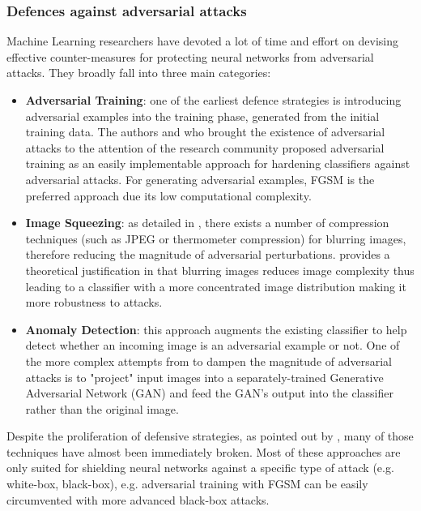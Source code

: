 \subsubsection{Defences against adversarial attacks}

Machine Learning researchers have devoted a lot of time and effort on devising effective counter-measures for protecting neural networks from adversarial attacks. They broadly fall into three main categories:

\begin{itemize}
	\item \textbf{Adversarial Training}: one of the earliest defence strategies is introducing adversarial examples into the training phase, generated from the initial training data. The authors \cite{Szegedy2014} and \cite{Goodfellow2014} who brought the existence of adversarial attacks to the attention of the research community proposed adversarial training as an easily implementable approach for hardening classifiers against adversarial attacks. For generating adversarial examples, FGSM is the preferred approach due its low computational complexity.
	\item \textbf{Image Squeezing}: as detailed in \cite{Nicolae2018AdversarialRT}, there exists a number of compression techniques (such as JPEG or thermometer compression) for blurring images, therefore reducing the magnitude of adversarial perturbations. \cite{Shafahi2018} provides a theoretical justification in that blurring images reduces image complexity thus leading to a classifier with a more concentrated image distribution making it more robustness to attacks.
	\item \textbf{Anomaly Detection}: this approach augments the existing classifier to help detect whether an incoming image is an adversarial example or not. One of the more complex attempts from \cite{Samangouei2018DefenseGANPC} to dampen the magnitude of adversarial attacks is to "project" input images into a separately-trained Generative Adversarial Network (GAN) and feed the GAN's output into the classifier rather than the original image.
\end{itemize}


Despite the proliferation of defensive strategies, as pointed out by \cite{Shafahi2018}, many of those techniques have almost been immediately broken. Most of these approaches are only suited for shielding neural networks against a specific type of attack (e.g. white-box, black-box), e.g. adversarial training with FGSM can be easily circumvented with more advanced black-box attacks.



